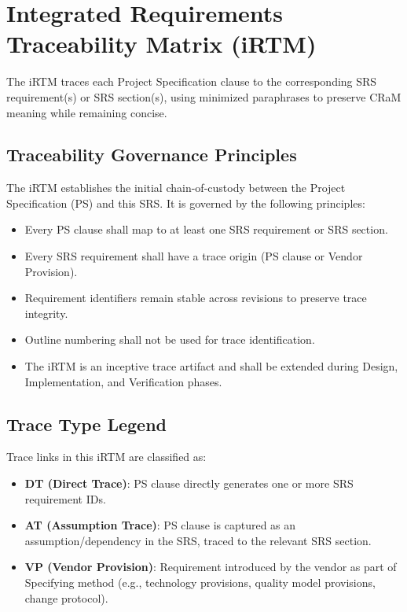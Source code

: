 \section{Integrated Requirements Traceability Matrix (iRTM)}
\label{sec:irtm}

The iRTM traces each Project Specification clause to the corresponding SRS requirement(s) or SRS section(s),
using minimized paraphrases to preserve CRaM meaning while remaining concise.

\subsection{Traceability Governance Principles}

The iRTM establishes the initial chain-of-custody between the Project Specification (PS) and this SRS.
It is governed by the following principles:

\begin{itemize}
  \item Every PS clause shall map to at least one SRS requirement or SRS section.
  \item Every SRS requirement shall have a trace origin (PS clause or Vendor Provision).
  \item Requirement identifiers remain stable across revisions to preserve trace integrity.
  \item Outline numbering shall not be used for trace identification.
  \item The iRTM is an inceptive trace artifact and shall be extended during Design, Implementation, and Verification phases.
\end{itemize}

\subsection{Trace Type Legend}

Trace links in this iRTM are classified as:

\begin{itemize}
  \item \textbf{DT (Direct Trace)}: PS clause directly generates one or more SRS requirement IDs.
  \item \textbf{AT (Assumption Trace)}: PS clause is captured as an assumption/dependency in the SRS, traced to the relevant SRS section.
  \item \textbf{VP (Vendor Provision)}: Requirement introduced by the vendor as part of Specifying method (e.g., technology provisions, quality model provisions, change protocol).
\end{itemize}

